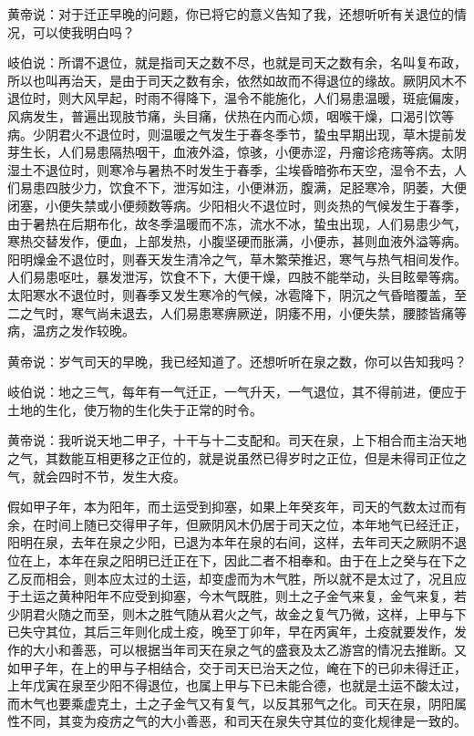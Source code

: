 \documentclass[12pt,UTF8]{ctexbook}
\begin{document}
黄帝说：对于迁正早晚的问题，你已将它的意义告知了我，还想听听有关退位的情况，可以使我明白吗？

岐伯说：所谓不退位，就是指司天之数不尽，也就是司天之数有余，名叫复布政，所以也叫再治天，是由于司天之数有余，依然如故而不得退位的缘故。厥阴风木不退位时，则大风早起，时雨不得降下，温令不能施化，人们易患温暖，斑疵偏废，风病发生，普遍出现肢节痛，头目痛，伏热在内而心烦，咽喉干燥，口渴引饮等病。少阴君火不退位时，则温暖之气发生于春冬季节，蛰虫早期出现，草木提前发芽生长，人们易患隔热咽干，血液外溢，惊骇，小便赤涩，丹瘤诊疮疡等病。太阴湿土不退位时，则寒冷与暑热不时发生于春季，尘埃昏暗弥布天空，湿令不去，人们易患四肢少力，饮食不下，泄泻如注，小便淋沥，腹满，足胫寒冷，阴萎，大便闭塞，小便失禁或小便频数等病。少阳相火不退位时，则炎热的气候发生于春季，由于暑热在后期布化，故冬季温暖而不冻，流水不冰，蛰虫出现，人们易患少气，寒热交替发作，便血，上部发热，小腹坚硬而胀满，小便赤，甚则血液外溢等病。阳明燥金不退位时，则春天发生清冷之气，草木繁荣推迟，寒气与热气相间发作。人们易患呕吐，暴发泄泻，饮食不下，大便干燥，四肢不能举动，头目眩晕等病。太阳寒水不退位时，则春季又发生寒冷的气候，冰雹降下，阴沉之气昏暗覆盖，至二之气时，寒气尚未退去，人们易患寒痹厥逆，阴痿不用，小便失禁，腰膝皆痛等病，温疠之发作较晚。

黄帝说：岁气司天的早晚，我已经知道了。还想听听在泉之数，你可以告知我吗？

岐伯说：地之三气，每年有一气迁正，一气升天，一气退位，其不得前进，便应于土地的生化，使万物的生化失于正常的时令。

黄帝说：我听说天地二甲子，十干与十二支配和。司天在泉，上下相合而主治天地之气，其数能互相更移之正位的，就是说虽然已得岁时之正位，但是未得司正位之气，就会四时不节，发生大疫。

假如甲子年，本为阳年，而土运受到抑塞，如果上年癸亥年，司天的气数太过而有余，在时间上随已交得甲子年，但厥阴风木仍居于司天之位，本年地气已经迁正，阳明在泉，去年在泉之少阳，已退为本年在泉的右间，这样，去年司天之厥阴不退位在上，本年在泉之阳明已迁正在下，因此二者不相奉和。由于在上之癸与在下之乙反而相会，则本应太过的土运，却变虚而为木气胜，所以就不是太过了，况且应于土运之黄种阳年不应受到抑塞，今木气既胜，则土之子金气来复，金气来复，若少阴君火随之而至，则木之胜气随从君火之气，故金之复气乃微，这样，上甲与下已失守其位，其后三年则化成土疫，晚至丁卯年，早在丙寅年，土疫就要发作，发作的大小和善恶，可以根据当年司天在泉之气的盛衰及太乙游宫的情况去推断。又如甲子年，在上的甲与子相结合，交于司天已治天之位，崦在下的已卯未得迁正，上年戊寅在泉至少阳不得退位，也属上甲与下已未能合德，也就是土运不酸太过，而木气也要乘虚克土，土之子金气又有复气，以反其邪气之化。司天在泉，阴阳属性不同，其变为疫疠之气的大小善恶，和司天在泉失守其位的变化规律是一致的。
\end{document}
